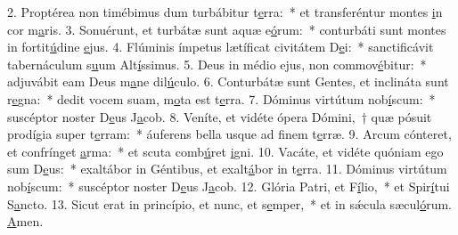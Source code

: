 2. Proptérea non timébimus dum turbábitur t\uline{e}rra:~* et transferéntur montes \uline{i}n cor m\uline{a}ris.
3. Sonuérunt, et turbátæ sunt aquæ e\uline{ó}rum:~* conturbáti sunt montes in fortit\uline{ú}dine \uline{e}jus.
4. Flúminis ímpetus lætíficat civitátem D\uline{e}i:~* sanctificávit tabernáculum s\uline{u}um Alt\uline{í}ssimus.
5. Deus in médio ejus, non commov\uline{é}bitur:~* adjuvábit eam Deus m\uline{a}ne dil\uline{ú}culo.
6. Conturbátæ sunt Gentes, et inclináta sunt r\uline{e}gna:~* dedit vocem suam, m\uline{o}ta est t\uline{e}rra.
7. Dóminus virtútum nob\uline{í}scum:~* suscéptor noster D\uline{e}us J\uline{a}cob.
8. Veníte, et vidéte ópera Dómini,~† quæ pósuit prodígia super t\uline{e}rram:~* áuferens bella usque ad f\uline{i}nem t\uline{e}rræ.
9. Arcum cónteret, et confrínget \uline{a}rma:~* et scuta comb\uline{ú}ret \uline{i}gni.
10. Vacáte, et vidéte quóniam ego sum D\uline{e}us:~* exaltábor in Géntibus, et exalt\uline{á}bor in t\uline{e}rra.
11. Dóminus virtútum nob\uline{í}scum:~* suscéptor noster D\uline{e}us J\uline{a}cob.
12. Glória Patri, et F\uline{í}lio,~* et Spir\uline{í}tui S\uline{a}ncto.
13. Sicut erat in princípio, et nunc, et s\uline{e}mper,~* et in sǽcula sæcul\uline{ó}rum. \uline{A}men.
